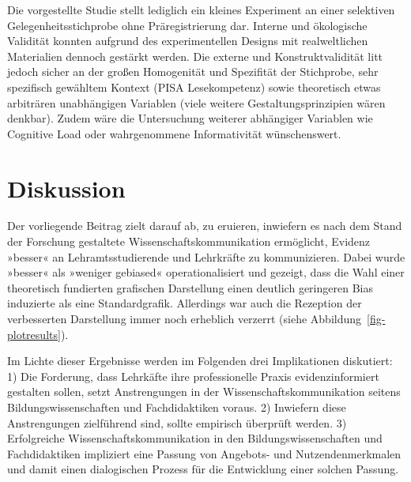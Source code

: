 \documentclass[
  jou,
  floatsintext,
  longtable,
  nolmodern,
  notxfonts,
  notimes,
  colorlinks=true,linkcolor=blue,citecolor=blue,urlcolor=blue]{apa7}
\begin{document}
Die vorgestellte Studie stellt lediglich ein kleines Experiment an einer
selektiven Gelegenheitsstichprobe ohne Präregistrierung dar. Interne und
ökologische Validität konnten aufgrund des experimentellen Designs mit
realweltlichen Materialien dennoch gestärkt werden. Die externe und
Konstruktvalidität litt jedoch sicher an der großen Homogenität und
Spezifität der Stichprobe, sehr spezifisch gewähltem Kontext (PISA
Lesekompetenz) sowie theoretisch etwas arbiträren unabhängigen Variablen
(viele weitere Gestaltungsprinzipien wären denkbar). Zudem wäre die
Untersuchung weiterer abhängiger Variablen wie Cognitive Load oder
wahrgenommene Informativität wünschenswert.

\section{Diskussion}\label{diskussion}

Der vorliegende Beitrag zielt darauf ab, zu eruieren, inwiefern es nach
dem Stand der Forschung gestaltete Wissenschaftskommunikation
ermöglicht, Evidenz »besser« an Lehramtsstudierende und Lehrkräfte zu
kommunizieren. Dabei wurde »besser« als »weniger gebiased«
operationalisiert und gezeigt, dass die Wahl einer theoretisch
fundierten grafischen Darstellung einen deutlich geringeren Bias
induzierte als eine Standardgrafik. Allerdings war auch die Rezeption
der verbesserten Darstellung immer noch erheblich verzerrt (siehe
Abbildung~\ref{fig-plotresults}).

Im Lichte dieser Ergebnisse werden im Folgenden drei Implikationen
diskutiert: 1) Die Forderung, dass Lehrkäfte ihre professionelle Praxis
evidenzinformiert gestalten sollen, setzt Anstrengungen in der
Wissenschaftskommunikation seitens Bildungswissenschaften und
Fachdidaktiken voraus. 2) Inwiefern diese Anstrengungen zielführend
sind, sollte empirisch überprüft werden. 3) Erfolgreiche
Wissenschaftskommunikation in den Bildungswissenschaften und
Fachdidaktiken impliziert eine Passung von Angebots- und
Nutzendenmerkmalen und damit einen dialogischen Prozess für die
Entwicklung einer solchen Passung.
\end{document}

